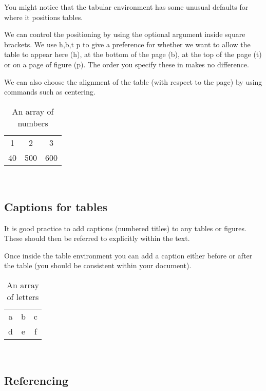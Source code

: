 \documentclass[a4paper,11pt]{article}
\begin{document}
You might notice that the tabular environment has some unusual defaults for where it positions tables.

We can control the positioning by using the optional argument inside square brackets. We use h,b,t p to give a preference for whether we want to allow the table to appear here (h), at the bottom of the page (b), at the top of the page (t) or on a page of figure (p). The order you specify these in makes no difference.

We can also choose the alignment of the table (with respect to the page) by using commands such as centering.
%
\begin{table}[hbtp]  %
	\centering %
	\begin{tabular}{c c c}
		1  & 2   & 3 \\
		40 & 500 & 600
	\end{tabular}\\
	\caption{An array of numbers}
\end{table}

\subsection{Captions for tables}

It is good practice to add captions (numbered titles) to any tables or figures. These should then be referred to explicitly within the text.

Once inside the table environment you can add a caption either before or after the table (you should be consistent within your document).
%
\begin{table}[hbtp]
	\centering
	\begin{tabular}{c c c}
		a  & b   & c \\
		d  & e   & f
	\end{tabular}\\
	\caption{An array of letters} %
\end{table}

\subsection{Referencing}
\end{document}
